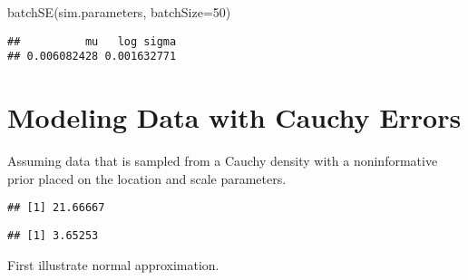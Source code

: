 \documentclass[
]{book}
\newenvironment{Shaded}{\begin{snugshade}}{\end{snugshade}}
\newcommand{\AttributeTok}[1]{\textcolor[rgb]{0.77,0.63,0.00}{#1}}
\newcommand{\DecValTok}[1]{\textcolor[rgb]{0.00,0.00,0.81}{#1}}
\newcommand{\FloatTok}[1]{\textcolor[rgb]{0.00,0.00,0.81}{#1}}
\newcommand{\FunctionTok}[1]{\textcolor[rgb]{0.00,0.00,0.00}{#1}}
\newcommand{\NormalTok}[1]{#1}
\newcommand{\SpecialCharTok}[1]{\textcolor[rgb]{0.00,0.00,0.00}{#1}}
\begin{document}
\begin{Shaded}
\begin{Highlighting}[]
 \FunctionTok{batchSE}\NormalTok{(sim.parameters, }\AttributeTok{batchSize=}\DecValTok{50}\NormalTok{)}
\end{Highlighting}
\end{Shaded}

\begin{verbatim}
##          mu   log sigma 
## 0.006082428 0.001632771
\end{verbatim}

\hypertarget{modeling-data-with-cauchy-errors}{%
\section{Modeling Data with Cauchy Errors}\label{modeling-data-with-cauchy-errors}}

Assuming data that is sampled from a Cauchy density with a noninformative prior placed on the location and scale parameters.

\begin{Shaded}
\end{Shaded}

\begin{verbatim}
## [1] 21.66667
\end{verbatim}

\begin{Shaded}
\end{Shaded}

\begin{verbatim}
## [1] 3.65253
\end{verbatim}

First illustrate normal approximation.

\begin{Shaded}
\end{Shaded}
\end{document}
